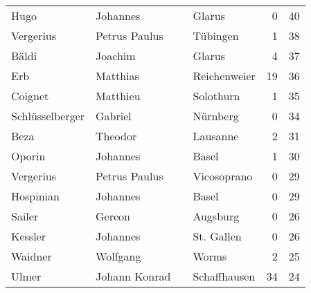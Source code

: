 \begin{center}
\begin{tiny}
\begin{longtabu}{llllrr}
                     Hugo &                           Johannes &             &                                      Glarus &          0 &        40 \\
                Vergerius &                      Petrus Paulus &             &                                    Tübingen &          1 &        38 \\
                    Bäldi &                            Joachim &             &                                      Glarus &          4 &        37 \\
                      Erb &                           Matthias &             &                                Reichenweier &         19 &        36 \\
                  Coignet &                           Matthieu &             &                                   Solothurn &          1 &        35 \\
          Schlüsselberger &                            Gabriel &             &                                    Nürnberg &          0 &        34 \\
                     Beza &                            Theodor &             &                                    Lausanne &          2 &        31 \\
                   Oporin &                           Johannes &             &                                       Basel &          1 &        30 \\
                Vergerius &                      Petrus Paulus &             &                                 Vicosoprano &          0 &        29 \\
                Hospinian &                           Johannes &             &                                       Basel &          0 &        29 \\
                   Sailer &                             Gereon &             &                                    Augsburg &          0 &        26 \\
                  Kessler &                           Johannes &             &                                  St. Gallen &          0 &        26 \\
                  Waidner &                           Wolfgang &             &                                       Worms &          2 &        25 \\
                    Ulmer &                      Johann Konrad &             &                                Schaffhausen &         34 &        24 \\

\end{longtabu}
\end{tiny}
\end{center}
